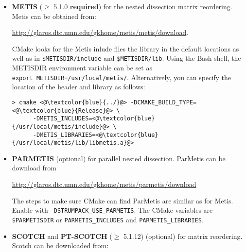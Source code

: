 \documentclass{article}
\begin{document}
\begin{itemize}
  manually:
  \begin{lstlisting}[style=Bash]
    > cmake <@\textcolor{blue}{../}@> -DCMAKE_BUILD_TYPE=<@\textcolor{blue}{Release}@> \
       -DSCALAPACK_LIBRARIES=<@\textcolor{blue}{"/path/to/scalapack/libscalapack.a;/path/to/blacs/libblacs.a"}@>
  \end{lstlisting}
  Or one can also directly modify the linker flags to add the
  ScaLAPACK and BLACS libraries:
  \begin{lstlisting}[style=Bash]
    > cmake <@\textcolor{blue}{../}@> -DCMAKE_BUILD_TYPE=<@\textcolor{blue}{Release}@> \
       -DCMAKE_EXE_LINKER_FLAGS=<@\textcolor{blue}{"-L/usr/lib64/mpich/lib/ -lscalapack -lmpiblacs"}@>
  \end{lstlisting}
\item \textbf{METIS}
  ($\geq$ 5.1.0 \textbf{required}) for the nested dissection matrix
  reordering. Metis can be obtained from:

  \url{http://glaros.dtc.umn.edu/gkhome/metis/metis/download}.

  CMake looks for the Metis inlude files the library in the default
  locations as well as in
  \lstinline[style=Bash]!$METISDIR/include!  and
  \lstinline[style=Bash]!$METISDIR/lib!. Using the Bash shell, the
  METISDIR environment variable can be set as\\
  \lstinline[style=Bash]!export METISDIR=/usr/local/metis/!.
  Alternatively, you can specify the
  location of the header and library as follows:
  \begin{lstlisting}[style=Bash]
    > cmake <@\textcolor{blue}{../}@> -DCMAKE_BUILD_TYPE=<@\textcolor{blue}{Release}@> \
      -DMETIS_INCLUDES=<@\textcolor{blue}{/usr/local/metis/include}@> \
      -DMETIS_LIBRARIES=<@\textcolor{blue}{/usr/local/metis/lib/libmetis.a}@>
  \end{lstlisting}

\item \textbf{PARMETIS} (optional) for parallel nested
  dissection. ParMetis can be download from

  \url{http://glaros.dtc.umn.edu/gkhome/metis/parmetis/download}

  The steps to make sure CMake can find ParMetis are similar as for
  Metis. Enable with \lstinline[style=Bash]!-DSTRUMPACK_USE_PARMETIS!.
  The CMake variables are
  \lstinline[style=Bash]!$PARMETISDIR! or
  \lstinline[style=Bash]!PARMETIS_INCLUDES! and
  \lstinline[style=Bash]!PARMETIS_LIBRARIES!.

\item \textbf{SCOTCH} and \textbf{PT-SCOTCH}
  ($\geq$ 5.1.12) (optional) for matrix reordering. Scotch can be
  downloaded from:


\end{itemize}
\end{document}
